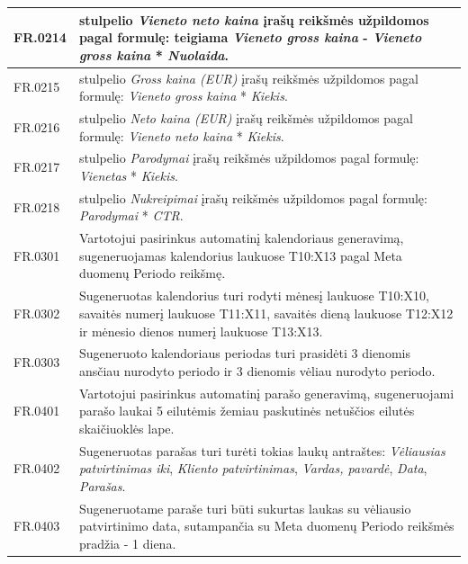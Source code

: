 {\begin{longtable}{|L{2cm}|L{13.5cm}|}
FR.0214 &
stulpelio \textit{Vieneto neto kaina} įrašų reikšmės užpildomos pagal formulę: teigiama \textit{Vieneto gross kaina} - \textit{Vieneto gross kaina} * \textit{Nuolaida}.
\\ \hline    
  
FR.0215 &
stulpelio \textit{Gross kaina (EUR)} įrašų reikšmės užpildomos pagal formulę: \textit{Vieneto gross kaina} * \textit{Kiekis}.
\\ \hline    
  
FR.0216 &
stulpelio \textit{Neto kaina (EUR)} įrašų reikšmės užpildomos pagal formulę: \textit{Vieneto neto kaina} * \textit{Kiekis}.
\\ \hline  
  
FR.0217 &
stulpelio \textit{Parodymai} įrašų reikšmės užpildomos pagal formulę: \textit{Vienetas} * \textit{Kiekis}.
\\ \hline    
  
FR.0218 &
stulpelio \textit{Nukreipimai} įrašų reikšmės užpildomos pagal formulę: \textit{Parodymai} * \textit{CTR}.
\\ \hline    
  
FR.0301 &
Vartotojui pasirinkus automatinį kalendoriaus generavimą, sugeneruojamas kalendorius laukuose T10:X13 pagal Meta duomenų Periodo reikšmę.
\\ \hline    
  
FR.0302 &
Sugeneruotas kalendorius turi rodyti mėnesį laukuose T10:X10, savaitės numerį laukuose T11:X11, savaitės dieną laukuose T12:X12 ir mėnesio dienos numerį laukuose T13:X13.
\\ \hline  
  
FR.0303 &
Sugeneruoto kalendoriaus periodas turi prasidėti 3 dienomis ansčiau nurodyto periodo ir 3 dienomis vėliau nurodyto periodo.
\\ \hline  
    
FR.0401 &
Vartotojui pasirinkus automatinį parašo generavimą, sugeneruojami parašo laukai 5 eilutėmis žemiau paskutinės netuščios eilutės skaičiuoklės lape.
\\ \hline    
    
FR.0402 &
Sugeneruotas parašas turi turėti tokias laukų antraštes: \textit{Vėliausias patvirtinimas iki}, \textit{Kliento patvirtinimas}, \textit{Vardas, pavardė}, \textit{Data}, \textit{Parašas}.
\\ \hline    
    
FR.0403 &
Sugeneruotame paraše turi būti sukurtas laukas su vėliausio patvirtinimo data, sutampančia su Meta duomenų Periodo reikšmės pradžia - 1 diena.
\\ \hline    
    

\end{longtable}}

